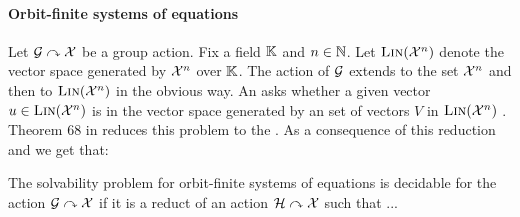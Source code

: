 \paragraph{Orbit-finite systems of equations}
%
Let $\mathcal{G}\curvearrowright\mathcal{X}$ be a group action.
Fix a field $\mathbb{K}$ and $n\in\mathbb{N}$.
Let $\textsc{Lin}(\mathcal{X}^n)$ denote the vector space generated by $\mathcal{X}^n$ over $\mathbb{K}$.
The action of $\mathcal{G}$ extends to the set $\mathcal{X}^n$ and then to $\textsc{Lin}(\mathcal{X}^n)$ in the obvious way.
An  asks whether a given vector $u\in\textsc{Lin}(\mathcal{X}^n)$ is in the vector space generated by an  set of vectors $V$ in $\textsc{Lin}(\mathcal{X}^n)$ \cite[Section 9]{GHOLAS24}.
Theorem 68 in \cite{GHOLAS24} reduces this problem to the .
As a consequence of this reduction and  we get that:
\begin{corollary}\label{cor:lin solv}
The solvability problem for orbit-finite systems of equations is decidable for the action $\mathcal{G}\curvearrowright\mathcal{X}$ if it is a reduct of an action $\mathcal{H}\curvearrowright\mathcal{X}$ such that ...
\end{corollary}


%
